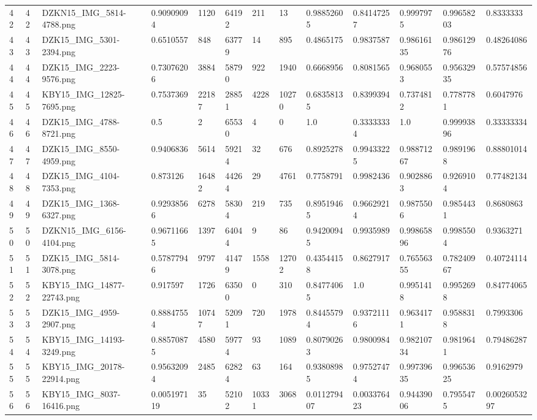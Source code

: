 \documentclass[11pt, a4paper, twoside]{report}
\begin{document}
\begin{longtable}[c]{@{}lllllllllllll@{}}
42 & 42 & DZKN15\_IMG\_5814-4788.png & 0.90909094 & 1120 & 64192 & 211 & 13 & 0.98852605 & 0.84147257 & 0.9997975 & 0.99658203 & 0.8333333 \\
43 & 43 & DZK15\_IMG\_5301-2394.png & 0.6510557 & 848 & 63779 & 14 & 895 & 0.4865175 & 0.9837587 & 0.98616135 & 0.98612976 & 0.48264086 \\
44 & 44 & DZK15\_IMG\_2223-9576.png & 0.73076206 & 3884 & 58790 & 922 & 1940 & 0.6668956 & 0.8081565 & 0.9680553 & 0.95632935 & 0.57574856 \\
45 & 45 & KBY15\_IMG\_12825-7695.png & 0.7537369 & 22187 & 28851 & 4228 & 10270 & 0.68358135 & 0.8399394 & 0.7374812 & 0.7787781 & 0.6047976 \\
46 & 46 & DZK15\_IMG\_4788-8721.png & 0.5 & 2 & 65530 & 4 & 0 & 1.0 & 0.33333334 & 1.0 & 0.99993896 & 0.33333334 \\
47 & 47 & DZK15\_IMG\_8550-4959.png & 0.9406836 & 5614 & 59214 & 32 & 676 & 0.8925278 & 0.99433225 & 0.98871267 & 0.9891968 & 0.88801014 \\
48 & 48 & DZK15\_IMG\_4104-7353.png & 0.873126 & 16482 & 44264 & 29 & 4761 & 0.7758791 & 0.9982436 & 0.9028863 & 0.9269104 & 0.77482134 \\
49 & 49 & DZK15\_IMG\_1368-6327.png & 0.92938566 & 6278 & 58304 & 219 & 735 & 0.89519465 & 0.96629214 & 0.9875506 & 0.9854431 & 0.8680863 \\
50 & 50 & DZKN15\_IMG\_6156-4104.png & 0.96711665 & 1397 & 64044 & 9 & 86 & 0.94200945 & 0.9935989 & 0.99865896 & 0.9985504 & 0.9363271 \\
51 & 51 & DZK15\_IMG\_5814-3078.png & 0.57877946 & 9797 & 41479 & 1558 & 12702 & 0.43544158 & 0.8627917 & 0.76556355 & 0.78240967 & 0.40724114 \\
52 & 52 & KBY15\_IMG\_14877-22743.png & 0.917597 & 1726 & 63500 & 0 & 310 & 0.84774065 & 1.0 & 0.9951418 & 0.9952698 & 0.84774065 \\
53 & 53 & DZK15\_IMG\_4959-2907.png & 0.88847554 & 10747 & 52091 & 720 & 1978 & 0.84455794 & 0.93721116 & 0.9634171 & 0.9588318 & 0.7993306 \\
54 & 54 & KBY15\_IMG\_14193-3249.png & 0.88570875 & 4580 & 59774 & 93 & 1089 & 0.80790263 & 0.9800984 & 0.98210734 & 0.9819641 & 0.79486287 \\
55 & 55 & KBY15\_IMG\_20178-22914.png & 0.95632094 & 2485 & 62824 & 63 & 164 & 0.93808985 & 0.97527474 & 0.99739635 & 0.99653625 & 0.9162979 \\
56 & 56 & KBY15\_IMG\_8037-16416.png & 0.005197119 & 35 & 52102 & 10331 & 3068 & 0.011279407 & 0.003376423 & 0.94439006 & 0.7955475 & 0.0026053297 \\

\end{longtable}
\end{document}
